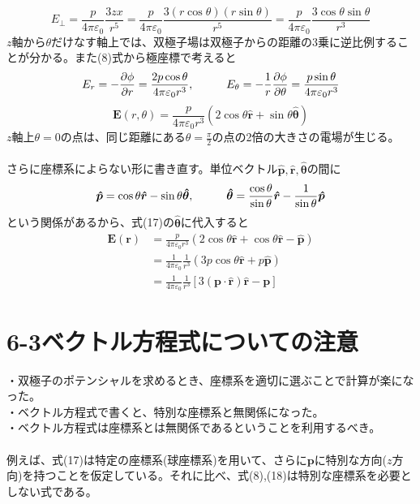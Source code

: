 \documentclass{jsarticle}
\begin{document}
\begin{equation}
E_{\perp}=\frac{p}{4\pi\varepsilon_{0}}\frac{3zx}{r^{5}}=\frac{p}{4\pi\varepsilon_{0}}\frac{3(r\cos\theta)(r\sin\theta)}{r^{5}}=\frac{p}{4\pi\varepsilon_{0}}\frac{3\cos\theta\sin\theta}{r^{3}}
\end{equation}
\(z\)軸から\(\theta\)だけなす軸上では、双極子場は双極子からの距離の3乗に逆比例することが分かる。また(8)式から極座標で考えると
\begin{equation}
E_{r}=-\frac{\partial\phi}{\partial r}=\frac{2p\cos\theta}{4\pi\varepsilon_{0}r^{3}},\hspace{10mm}
E_{\theta}=-\frac{1}{r}\frac{\partial\phi}{\partial\theta}=\frac{p\sin\theta}{4\pi\varepsilon_{0}r^{3}}
\end{equation}
\begin{equation}
\bm{E}(r,\theta)=\frac{p}{4\pi\varepsilon_{0}r^{3}}(2\cos\theta\bm{\hat{r}}+\sin\theta\bm{\hat{\theta}})
\end{equation}
\(z\)軸上\(\theta=0\)の点は、同じ距離にある\(\theta=\frac{\pi}{2}\)の点の2倍の大きさの電場が生じる。\\
\\


\newpage
\noindent
さらに座標系によらない形に書き直す。単位ベクトル\(\bm{\hat{p}},\bm{\hat{r}},\bm{\hat{\theta}}\)の間に
\[\bm{\hat{p}}=\cos\theta\bm{\hat{r}}-\sin\theta\bm{\hat{\theta}},\hspace{10mm}\bm{\hat{\theta}}=\frac{\cos\theta}{\sin\theta}\bm{\hat{r}}-\frac{1}{\sin\theta}\bm{\hat{p}}\]
という関係があるから、式(17)の\(\bm{\hat{\theta}}\)に代入すると
\begin{align}
\bm{E}(\bm{r})&=\frac{p}{4\pi\varepsilon_{0}r^{3}}(2\cos\theta\bm{\hat{r}}+\cos\theta\bm{\hat{r}}-\bm{\hat{p}})\nonumber\\
&=\frac{1}{4\pi\varepsilon_{0}}\frac{1}{r^{3}}(3p\cos\theta\bm{\hat{r}}+p\bm{\hat{p}})\nonumber\\
&=\frac{1}{4\pi\varepsilon_{0}}\frac{1}{r^{3}}\left[3(\bm{p}\cdot\bm{\hat{r}})\bm{\hat{r}}-\bm{p}\right]
\end{align}

\section*{6-3\hspace{5mm}ベクトル方程式についての注意}
\noindent
・双極子のポテンシャルを求めるとき、座標系を適切に選ぶことで計算が楽になった。\\
・ベクトル方程式で書くと、特別な座標系と無関係になった。\\
・ベクトル方程式は座標系とは無関係であるということを利用するべき。\\
\\
例えば、式(17)は特定の座標系(球座標系)を用いて、さらに\(\bm{p}\)に特別な方向(\(z\)方向)を持つことを仮定している。それに比べ、式(8),(18)は特別な座標系を必要としない式である。\\
\\
\end{document}
